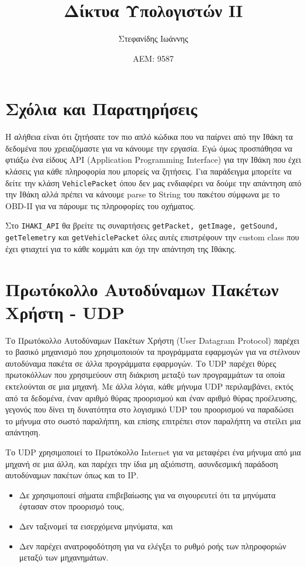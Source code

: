 \documentclass{article}
\author{Στεφανίδης Ιωάννης}
\title{Δίκτυα Υπολογιστών ΙΙ}
\date{ΑΕΜ: 9587}
\begin{document}
\maketitle

\section{Σχόλια και Παρατηρήσεις}

Η αλήθεια είναι ότι ζητήσατε τον πιο απλό κώδικα που να παίρνει από την Ιθάκη
τα δεδομένα που χρειαζόμαστε για να κάνουμε την εργασία. Εγώ όμως προσπάθησα να
φτιάξω ένα είδους API (Application Programming Interface) για την Ιθάκη που
έχει κλάσεις για κάθε πληροφορία που μπορείς να ζητήσεις. Για παράδειγμα
μπορείτε να δείτε την κλάση \texttt{VehiclePacket} όπου δεν μας ενδιαφέρει να
δούμε την απάντηση από την Ιθάκη αλλά πρέπει να κάνουμε parse το String του
πακέτου σύμφωνα με το OBD-II για να πάρουμε τις πληροφορίες του οχήματος.

Στο \texttt{IHAKI\_API} θα βρείτε τις συναρτήσεις \texttt{getPacket,
getImage, getSound, getTelemetry} και \texttt{getVehiclePacket} όλες αυτές
επιστρέφουν την custom class που έχει φτιαχτεί για το κάθε κομμάτι και
όχι την απάντηση της Ιθάκης.

\section{Πρωτόκολλο Αυτοδύναμων Πακέτων Χρήστη - UDP}

Το Πρωτόκολλο Αυτοδύναμων Πακέτων Χρήστη (User Datagram Protocol)\cite{udpwebsite}
παρέχει το βασικό μηχανισμό που χρησιμοποιούν τα προγράμματα εφαρμογών για να
στέλνουν αυτοδύναμα πακέτα σε άλλα προγράμματα εφαρμογών. Το UDP παρέχει θύρες
πρωτοκόλλων που χρησιμεύουν στη διάκριση μεταξύ των προγραμμάτων τα οποία
εκτελούνται σε μια μηχανή. Με άλλα λόγια, κάθε μήνυμα UDP περιλαμβάνει, εκτός
από τα δεδομένα, έναν αριθμό θύρας προορισμού και έναν αριθμό θύρας προέλευσης,
γεγονός που δίνει τη δυνατότητα στο λογισμικό UDP του προορισμού να παραδώσει
το μήνυμα στο σωστό παραλήπτη, και επίσης επιτρέπει στον παραλήπτη να στείλει
μια απάντηση.

Το UDP χρησιμοποιεί το Πρωτόκολλο Internet για να μεταφέρει ένα μήνυμα από μια
μηχανή σε μια άλλη, και παρέχει την ίδια μη αξιόπιστη, ασυνδεσμική παράδοση
αυτοδύνα­μων πακέτων όπως και το ΙΡ.
\begin{itemize}
  \item Δε χρησιμοποιεί σήματα επιβεβαίωσης για να σιγουρευτεί ότι τα μηνύματα
 έφτασαν στον προορισμό τους,
  \item Δεν ταξινομεί τα εισερχόμενα μηνύματα, και
  \item Δεν παρέχει ανατροφοδότηση για να ελέγξει το ρυθμό ροής των πληροφοριών
 μεταξύ των μηχα­νημάτων.
\end{itemize}
\end{document}
